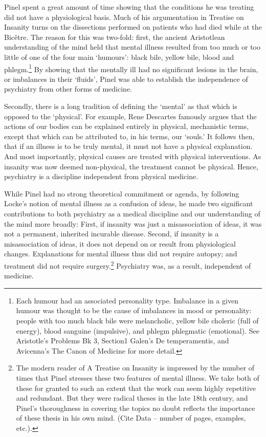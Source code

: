 Pinel spent a great amount of time showing that the conditions he was treating did not have a physiological basis. Much of his argumentation in Treatise on Insanity turns on the dissections performed on patients who had died while at the Bicêtre. The reason for this was two-fold: first, the ancient Aristotlean understanding of the mind held that mental illness resulted from too much or too little of one of the four main `humours': black bile, yellow bile, blood and phlegm.\footnote{Each humour had an associated personality type. Imbalance in a given humour was thought to be the cause of imbalances in mood or personality: people with too much black bile were melancholic, yellow bile choleric (full of energy), blood sanguine (impulsive), and phlegm phlegmatic (emotional). See Aristotle's Problems Bk 3, Section1 Galen's De temperamentis, and Avicenna's The Canon of Medicine for more detail.} By showing that the mentally ill had no significant lesions in the brain, or imbalances in their `fluids', Pinel was able to establish the independence of psychiatry from other forms of medicine.

Secondly, there is a long tradition of defining the `mental' as that which is opposed to the `physical'. For example, Rene Descartes famously argues that the actions of our bodies can be explained entirely in physical, mechanistic terms, except that which can be attributed to, in his terms, our `souls.' It follows then, that if an illness is to be truly mental, it must not have a physical explanation. And most importantly, physical causes are treated with physical interventions. As insanity was now deemed non-physical, the treatment cannot be physical. Hence, psychiatry is a discipline independent from physical medicine.

While Pinel had no strong theoretical commitment or agenda, by following Locke's notion of mental illness as a confusion of ideas, he made two significant contributions to both psychiatry as a medical discipline and our understanding of the mind more broadly: First, if insanity was just a misassociation of ideas, it was not a permanent, inherited incurable disease. Second, if insanity is a misassociation of ideas, it does not depend on or result from physiological changes. Explanations for mental illness thus did not require autopsy; and treatment did not require surgery.\footnote{The modern reader of A Treatise on Insanity is impressed by the number of times that Pinel stresses these two features of mental illness. We take both of these for granted to such an extent that the work can seem highly repetitive and redundant. But they were radical theses in the late 18th century, and Pinel's thoroughness in covering the topics no doubt reflects the importance of these thesis in his own mind. (Cite Data – number of pages, examples, etc.).} Psychiatry was, as a result, independent of medicine.

